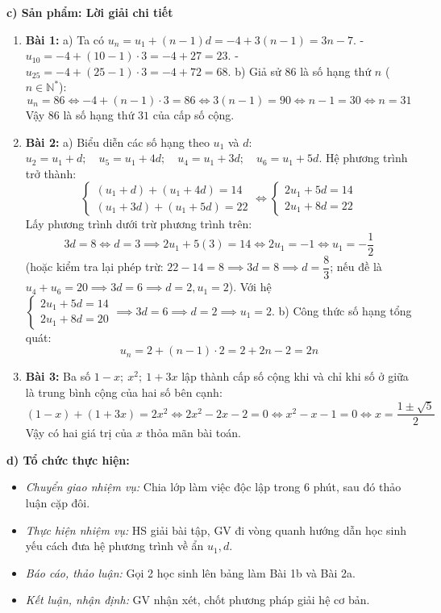 \documentclass[12pt, a4paper]{article}
\begin{document}
\noindent \textbf{c) Sản phẩm: Lời giải chi tiết}  
\begin{enumerate}[leftmargin=0.6cm]  
    \item \textbf{Bài 1:}  
    a) Ta có $u_n = u_1 + (n - 1)d = -4 + 3(n - 1) = 3n - 7$.  
    - $u_{10} = -4 + (10 - 1) \cdot 3 = -4 + 27 = 23$.  
    - $u_{25} = -4 + (25 - 1) \cdot 3 = -4 + 72 = 68$.  
    b) Giả sử $86$ là số hạng thứ $n$ ($n \in \mathbb{N}^*$):  
    $$u_n = 86 \iff -4 + (n - 1) \cdot 3 = 86 \iff 3(n - 1) = 90 \iff n - 1 = 30 \iff n = 31$$  
    Vậy $86$ là số hạng thứ $31$ của cấp số cộng.  
  
    \item \textbf{Bài 2:}  
    a) Biểu diễn các số hạng theo $u_1$ và $d$:  
    $u_2 = u_1 + d;\quad u_5 = u_1 + 4d;\quad u_4 = u_1 + 3d;\quad u_6 = u_1 + 5d$.  
    Hệ phương trình trở thành:  
    $$\begin{cases} (u_1 + d) + (u_1 + 4d) = 14 \\ (u_1 + 3d) + (u_1 + 5d) = 22 \end{cases} \iff \begin{cases} 2u_1 + 5d = 14 \\ 2u_1 + 8d = 22 \end{cases}$$  
    Lấy phương trình dưới trừ phương trình trên:  
    $$3d = 8 \iff d = 3 \implies 2u_1 + 5(3) = 14 \iff 2u_1 = -1 \iff u_1 = -\dfrac{1}{2}$$  
    (hoặc kiểm tra lại phép trừ: $22 - 14 = 8 \implies 3d = 8 \implies d = \dfrac{8}{3}$; nếu đề là $u_4 + u_6 = 20 \implies 3d = 6 \implies d = 2, u_1 = 2$).  
    Với hệ $\begin{cases} 2u_1 + 5d = 14 \\ 2u_1 + 8d = 20 \end{cases} \implies 3d = 6 \implies d = 2 \implies u_1 = 2$.  
    b) Công thức số hạng tổng quát:  
    $$u_n = 2 + (n - 1) \cdot 2 = 2 + 2n - 2 = 2n$$  
  
    \item \textbf{Bài 3:}  
    Ba số $1 - x;\ x^2;\ 1 + 3x$ lập thành cấp số cộng khi và chỉ khi số ở giữa là trung bình cộng của hai số bên cạnh:  
    $$(1 - x) + (1 + 3x) = 2x^2 \iff 2x^2 - 2x - 2 = 0 \iff x^2 - x - 1 = 0 \iff x = \dfrac{1 \pm \sqrt{5}}{2}$$  
    Vậy có hai giá trị của $x$ thỏa mãn bài toán.  
\end{enumerate}  
  
\noindent \textbf{d) Tổ chức thực hiện:}  
\begin{itemize}[leftmargin=0.8cm]  
    \item \textit{Chuyển giao nhiệm vụ:} Chia lớp làm việc độc lập trong 6 phút, sau đó thảo luận cặp đôi.  
    \item \textit{Thực hiện nhiệm vụ:} HS giải bài tập, GV đi vòng quanh hướng dẫn học sinh yếu cách đưa hệ phương trình về ẩn $u_1, d$.  
    \item \textit{Báo cáo, thảo luận:} Gọi 2 học sinh lên bảng làm Bài 1b và Bài 2a.  
    \item \textit{Kết luận, nhận định:} GV nhận xét, chốt phương pháp giải hệ cơ bản.  
\end{itemize}  
  
\end{document}
